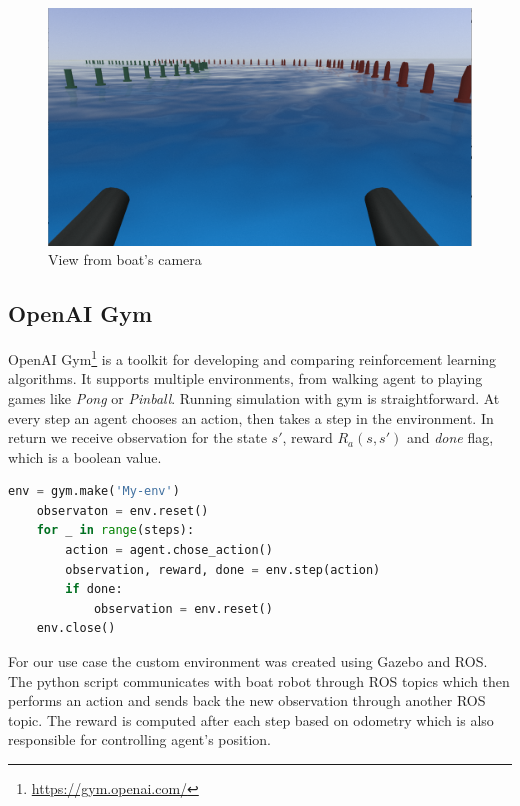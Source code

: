 \begin{figure}[h]
    \centering
    \includegraphics[width=16cm]{img/front_camera_image.png}
    \caption{View from boat's camera}
    \label{fig:camera-view}
\end{figure}

\subsection{OpenAI Gym}
\label{sub:openai-gym}

OpenAI Gym\footnote{\url{https://gym.openai.com/}} is a toolkit for developing and comparing reinforcement learning algorithms. It supports multiple environments, from walking agent to playing games like \emph{Pong} or \emph{Pinball}. Running simulation with gym is straightforward. At every step an agent chooses an action, then takes a step in the environment. In return we receive observation for the state $s'$, reward $R_a(s, s')$ and \emph{done} flag, which is a boolean value.

\begin{lstlisting}[language=Python, caption={Example gym environment simulation}]
    env = gym.make('My-env')
    observaton = env.reset()
    for _ in range(steps):
        action = agent.chose_action()
        observation, reward, done = env.step(action)
        if done:
            observation = env.reset()
    env.close()
\end{lstlisting}

For our use case the custom environment was created using Gazebo and ROS. The python script communicates with boat robot through ROS topics which then performs an action and sends back the new observation through another ROS topic. The reward is computed after each step based on odometry which is also responsible for controlling agent's position.

